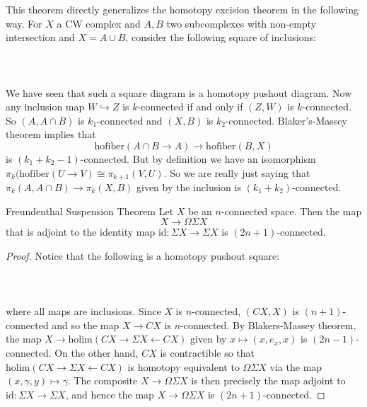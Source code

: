 \documentclass[a4paper]{article}
\begin{document}
This theorem directly generalizes the homotopy excision theorem in the following way. For $X$ a CW complex and $A,B$ two subcomplexes with non-empty intersection and $X=A\cup B$, consider the following square of inclusions: \\~\\
\\~\\
We have seen that such a square diagram is a homotopy pushout diagram. Now any inclusion map $W\hookrightarrow Z$ is $k$-connected if and only if $(Z,W)$ is $k$-connected. So $(A,A\cap B)$ is $k_1$-connected and $(X,B)$ is $k_2$-connected. Blaker's-Massey theorem implies that $$\text{hofiber}(A\cap B\to A)\to\text{hofiber}(B,X)$$ is $(k_1+k_2-1)$-connected. But by definition we have an isomorphism $\pi_k(\text{hofiber}(U\to V)\cong\pi_{k+1}(V,U)$. So we are really just saying that $\pi_k(A,A\cap B)\to\pi_k(X,B)$ given by the inclusion is $(k_1+k_2)$-connected. 

\begin{thm}{Freundenthal Suspension Theorem}{} Let $X$ be an $n$-connected space. Then the map $$X\to\Omega\Sigma X$$ that is adjoint to the identity map $\text{id}:\Sigma X\to\Sigma X$ is $(2n+1)$-connected. \tcbline
\begin{proof}
Notice that the following is a homotopy pushout square: \\~\\
\\~\\
where all maps are inclusions. Since $X$ is $n$-connected, $(CX,X)$ is $(n+1)$-connected and so the map $X\to CX$ is $n$-connected. By Blakers-Massey theorem, the map $X\to\text{holim}(CX\rightarrow\Sigma X\leftarrow CX)$ given by $x\mapsto(x,e_x,x)$ is $(2n-1)$-connected. On the other hand, $CX$ is contractible so that $\text{holim}(CX\rightarrow\Sigma X\leftarrow CX)$ is homotopy equivalent to $\Omega\Sigma X$ via the map $(x,\gamma,y)\mapsto\gamma$. The composite $X\to\Omega\Sigma X$ is then precisely the map adjoint to $\text{id}:\Sigma X\to\Sigma X$, and hence the map $X\to\Omega\Sigma X$ is $(2n+1)$-connected. 
\end{proof}
\end{thm}
\end{document}
